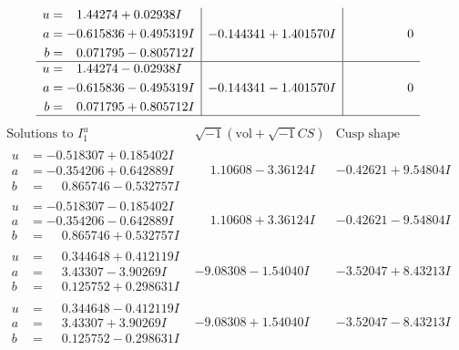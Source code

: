 \documentclass[1p]{elsarticle_modified}
\theoremstyle{definition}
\newcommand{\I}{\sqrt{-1}}
\begin{document}
$$\begin{array}{c|c|c}
\begin{aligned}
u &= \phantom{-}1.44274 + 0.02938 I \\
a &= -0.615836 + 0.495319 I \\
b &= \phantom{-}0.071795 - 0.805712 I\end{aligned}
 & -0.144341 + 1.401570 I & \phantom{-0.000000 } 0 \\ \hline\begin{aligned}
u &= \phantom{-}1.44274 - 0.02938 I \\
a &= -0.615836 - 0.495319 I \\
b &= \phantom{-}0.071795 + 0.805712 I\end{aligned}
 & -0.144341 - 1.401570 I & \phantom{-0.000000 } 0\\
 \hline 
 \end{array}$$\newpage$$\begin{array}{c|c|c}  
\text{Solutions to }I^u_{1}& \I (\text{vol} + \sqrt{-1}CS) & \text{Cusp shape}\\
 \hline 
\begin{aligned}
u &= -0.518307 + 0.185402 I \\
a &= -0.354206 + 0.642889 I \\
b &= \phantom{-}0.865746 - 0.532757 I\end{aligned}
 & \phantom{-}1.10608 - 3.36124 I & -0.42621 + 9.54804 I \\ \hline\begin{aligned}
u &= -0.518307 - 0.185402 I \\
a &= -0.354206 - 0.642889 I \\
b &= \phantom{-}0.865746 + 0.532757 I\end{aligned}
 & \phantom{-}1.10608 + 3.36124 I & -0.42621 - 9.54804 I \\ \hline\begin{aligned}
u &= \phantom{-}0.344648 + 0.412119 I \\
a &= \phantom{-}3.43307 - 3.90269 I \\
b &= \phantom{-}0.125752 + 0.298631 I\end{aligned}
 & -9.08308 - 1.54040 I & -3.52047 + 8.43213 I \\ \hline\begin{aligned}
u &= \phantom{-}0.344648 - 0.412119 I \\
a &= \phantom{-}3.43307 + 3.90269 I \\
b &= \phantom{-}0.125752 - 0.298631 I\end{aligned}
 & -9.08308 + 1.54040 I & -3.52047 - 8.43213 I \\ \hline\begin{aligned}

\end{aligned}
\end{array}$$
\end{document}

